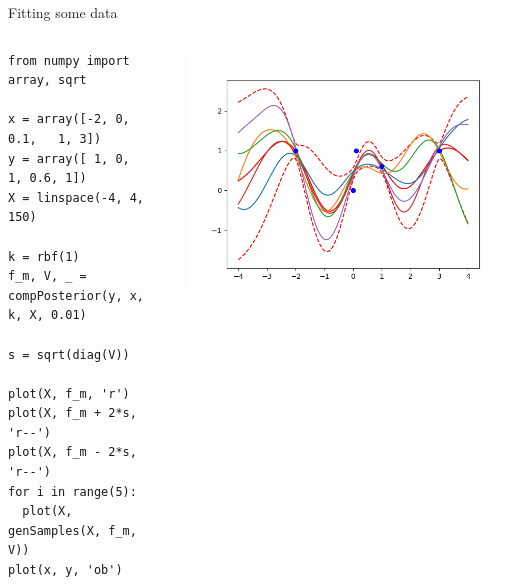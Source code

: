 \documentclass[presentation]{beamer}
\begin{document}
\begin{frame}[fragile,label={sec:orgc85e828}]{Fitting some data}
 \begin{columns}
\begin{column}{0.35\columnwidth}
\begin{verbatim}
from numpy import array, sqrt

x = array([-2, 0, 0.1,   1, 3])
y = array([ 1, 0,   1, 0.6, 1])
X = linspace(-4, 4, 150)

k = rbf(1)
f_m, V, _ = compPosterior(y, x, k, X, 0.01)

s = sqrt(diag(V))

plot(X, f_m, 'r')
plot(X, f_m + 2*s, 'r--')
plot(X, f_m - 2*s, 'r--')
for i in range(5):
  plot(X, genSamples(X, f_m, V))
plot(x, y, 'ob')
\end{verbatim}
\end{column}


\begin{column}{0.55\columnwidth}
\begin{center}
\includegraphics[width=.9\linewidth]{images/fig04.png}
\end{center}
\end{column}
\end{columns}
\end{frame}
\end{document}
